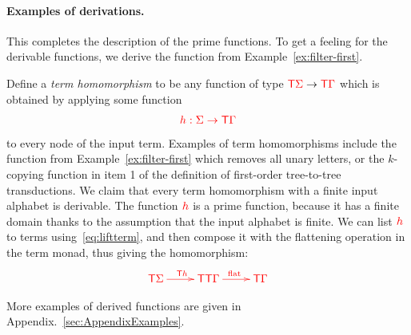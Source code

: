 

\paragraph*{Examples of derivations.} This completes the description of the prime functions.  To get a feeling for the derivable functions, we derive the function from Example~\ref{ex:filter-first}.
\noindent\begin{example}\label{ex:filter} 
   Define a \emph{term homomorphism}  to be any function of type ${\color{red}{\mathsf T}} {\color{red}{\Sigma}} \to {\color{red}{\mathsf T}} {\color{red}{\Gamma}}$ which is obtained by applying some function
   \begin{align*}
   {\color{red}{h : {\color{red}{\Sigma}}\to {\color{red}{\mathsf T}}{\color{red}{\Gamma}}}}
   \end{align*}
   to every node of the input term. Examples of term homomorphisms include the function from Example~\ref{ex:filter-first} which removes all unary letters, or the $k$-copying function in item 1 of the definition of first-order tree-to-tree transductions.  We claim that every term homomorphism with a finite input alphabet is derivable. The function ${\color{red}{h}}$ is a prime function, because it has a finite domain thanks to the assumption that the input alphabet is finite. We can list ${\color{red}{h}}$ to terms using~\eqref{eq:liftterm}, and then compose it with the flattening operation in the term monad, thus giving the homomorphism:
   \begin{align*}
   \ranked{\xymatrix{
\tmonad \rSigma \ar[r]^{\tmonad h} &
\tmonad \tmonad \rGamma \ar[r]^{\flatt} &
\tmonad \rGamma
   }}
   \end{align*} 
\end{example}

More examples of derived functions are given in Appendix.~\ref{sec:AppendixExamples}.

